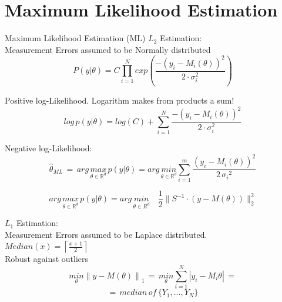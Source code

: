\newpage
\section*{Maximum Likelihood Estimation}
Maximum Likelihood Estimation (ML) \({L}_{2}\) Estimation:\\
Measurement Errors assumed to be Normally distributed
\begin{equation*}
{ P(y|\theta ) }=C\prod _{ i=1 }^{ N }{ exp(\frac { -(y_{ i }-M_{ i }(\theta ))^{ 2 } }{ 2\cdot \sigma _{ i }^{ 2 } } )} 
\end{equation*}

Positive log-Likelihood. Logarithm makes from products a sum!
\begin{equation*}
{ log \, p(y|\theta ) } = log(C) +\sum _{ i=1 }^{ N }{ { \frac { -(y_{ i }-M_{ i }(\theta ))^{ 2 } }{ 2 \cdot \sigma _{ i }^{ 2 } }  } } 
\end{equation*}

Negative log-Likelihood:
\begin{equation*}
\hat{\theta}_{ML} \, = \, arg \, \underset { \theta \in { \mathbb{R} }^{ d } }{ max } \, p(y|\theta ) = arg \, \underset { \theta \in { \mathbb{R} }^{ d } }{ min }  \sum _{ i=1 }^{ m }{ \frac { (y_{ i }-M_{ i }(\theta ))^{ 2 } }{ 2\, { \sigma _{ i } }^{ 2 } }  } 
\end{equation*}

\begin{equation*}
arg \, \underset{ \theta \in \mathbb{ R }^{ d } }{ max } \, p(y|\theta ) = arg \, \underset { \theta \in {  R }^{ d } }{ min } \quad \frac{1}{2} \parallel S^{ -1 }\cdot (y-M(\theta )){ \parallel  }_{ 2 }^{ 2 }
\end{equation*}

\({L}_{1}\) Estimation:\\
Measurement Errors assumed to be Laplace distributed.\\ \(Median(x)=\left\lceil \frac { x + 1 }{ 2 }  \right\rceil \)\\
Robust against outliers
\begin{equation*}
\underset { \theta  }{ min } { \parallel y-M(\theta )\parallel  }_{ 1 }\,=\,\underset { \theta  }{ min } \sum _{ i=1 }^{ N }{ |{ y }_{ i }-{ M }_{ i }\theta | } \,=
\end{equation*}
\begin{equation*}
=\,median\,of\,\{{Y}_{1},...,{Y}_{N}\}
\end{equation*}



